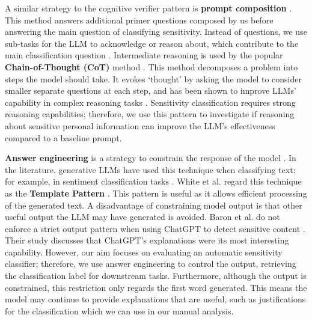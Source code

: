 A similar strategy to the cognitive verifier pattern is \textbf{prompt composition} \cite{liu2023pre}. This method answers additional primer questions composed by us before answering the main question of classifying sensitivity. Instead of questions, we use sub-tasks for the LLM to acknowledge or reason about, which contribute to the main classification question \cite{han2022ptr}. Intermediate reasoning is used by the popular \textbf{Chain-of-Thought (CoT)} method \cite{wei2022chain, fei2023reasoning}. This method decomposes a problem into steps the model should take. It evokes ‘thought’ by asking the model to consider smaller separate questions at each step, and has been shown to improve LLMs' capability in complex reasoning tasks \cite{wei2022chain}. Sensitivity classification requires strong reasoning capabilities; therefore, we use this pattern to investigate if reasoning about sensitive personal information can improve the LLM's effectiveness compared to a baseline prompt.

\textbf{Answer engineering} is a strategy to constrain the response of the model \cite{liu2023pre}. In the literature, generative LLMs have used this technique when classifying text; for example, in sentiment classification tasks \cite{yin2019benchmarking, kocon2023chatgpt}. White et al. regard this technique as the \textbf{Template Pattern} \cite{white2023prompt}. This pattern is useful as it allows efficient processing of the generated text. A disadvantage of constraining model output is that other useful output the LLM may have generated is avoided. Baron et al. do not enforce a strict output pattern when using ChatGPT to detect sensitive content \cite{baron2023using}. Their study discusses that ChatGPT's explanations were its most interesting capability. However, our aim focuses on evaluating an automatic sensitivity classifier; therefore, we use answer engineering to control the output, retrieving the classification label for downstream tasks. Furthermore, although the output is constrained, this restriction only regards the first word generated. This means the model may continue to provide explanations that are useful, such as justifications for the classification which we can use in our manual analysis.

